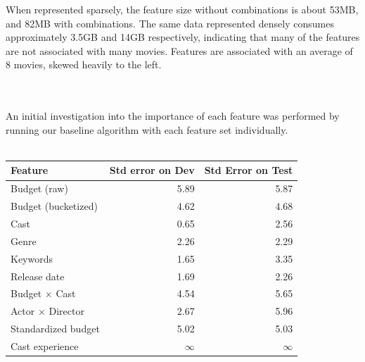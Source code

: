 \documentclass[journal]{IEEEtran}
\begin{document}
When represented sparsely, the feature size without combinations is about 53MB, and 82MB with combinations.  The same data represented
densely consumes approximately 3.5GB and 14GB respectively, indicating that many of the features are not associated with many movies.  Features are associated with an average of 8 movies, skewed heavily to the left. \\
\\
\\
\par An initial investigation into the importance of each feature was performed by
running our baseline algorithm with each feature set individually.\\
\\
\begin{tabular}{|l|r r|} %
\hline
Feature & Std error on Dev & Std Error on Test \\ [0.5ex] %
\hline %
Budget (raw) & 5.89 & 5.87 \\ %
Budget (bucketized) & 4.62 & 4.68 \\
Cast & 0.65 & 2.56 \\
Genre & 2.26 & 2.29 \\
Keywords & 1.65 & 3.35 \\
Release date & 1.69 & 2.26 \\
\hline
Budget $\times$ Cast & 4.54 & 5.65 \\
Actor $\times$ Director & 2.67 & 5.96 \\
\hline
Standardized budget & 5.02 & 5.03 \\
Cast experience & $\infty$ & $\infty$ \\
\hline
\end{tabular}
\end{document}

